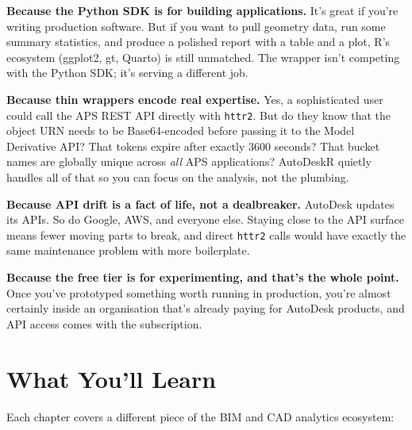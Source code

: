 \documentclass[
  11pt,
  letterpaper,
  DIV=11,
  numbers=noendperiod]{scrreprt}
\begin{document}
\textbf{Because the Python SDK is for building applications.} It's great
if you're writing production software. But if you want to pull geometry
data, run some summary statistics, and produce a polished report with a
table and a plot, R's ecosystem (ggplot2, gt, Quarto) is still
unmatched. The wrapper isn't competing with the Python SDK; it's serving
a different job.

\textbf{Because thin wrappers encode real expertise.} Yes, a
sophisticated user could call the APS REST API directly with
\texttt{httr2}. But do they know that the object URN needs to be
Base64-encoded before passing it to the Model Derivative API? That
tokens expire after exactly 3600 seconds? That bucket names are globally
unique across \emph{all} APS applications? AutoDeskR quietly handles all
of that so you can focus on the analysis, not the plumbing.

\textbf{Because API drift is a fact of life, not a dealbreaker.}
AutoDesk updates its APIs. So do Google, AWS, and everyone else. Staying
close to the API surface means fewer moving parts to break, and direct
\texttt{httr2} calls would have exactly the same maintenance problem
with more boilerplate.

\textbf{Because the free tier is for experimenting, and that's the whole
point.} Once you've prototyped something worth running in production,
you're almost certainly inside an organisation that's already paying for
AutoDesk products, and API access comes with the subscription.

\section*{What You'll Learn}\label{what-youll-learn}


Each chapter covers a different piece of the BIM and CAD analytics
ecosystem:
\end{document}
